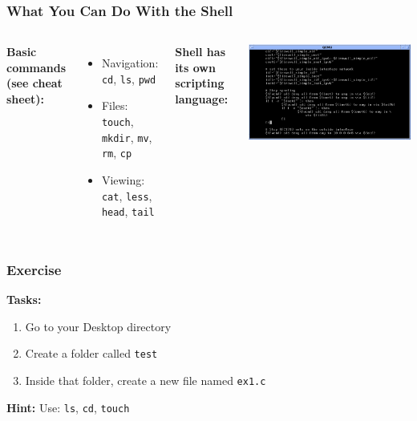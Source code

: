 \documentclass[aspectratio=169]{beamer}
\begin{document}
\begin{frame}
  \frametitle{What You Can Do With the Shell}

  \begin{columns}[T] 
    \begin{minipage}[t]{\linewidth}
      \textbf{Basic commands (see cheat sheet):}
      \begin{itemize}
        \item Navigation: \texttt{cd}, \texttt{ls}, \texttt{pwd}
        \item Files: \texttt{touch}, \texttt{mkdir}, \texttt{mv}, \texttt{rm}, \texttt{cp}
        \item Viewing: \texttt{cat}, \texttt{less}, \texttt{head}, \texttt{tail}
      \end{itemize}
    \end{minipage}

    \begin{minipage}[t]{\linewidth}
      \textbf{Shell has its own scripting language:}

      \vspace{0.5em}
      \includegraphics[width=\linewidth]{img/shell-scripting1.png}
    \end{minipage}
  \end{columns}
\end{frame}


\begin{frame}
  \frametitle{Exercise}
  \textbf{Tasks:}
  \begin{enumerate}
    \item Go to your Desktop directory
    \item Create a folder called \texttt{test}
    \item Inside that folder, create a new file named \texttt{ex1.c}
  \end{enumerate}

  \vspace{1em}
  \textbf{Hint:}
  Use: \texttt{ls}, \texttt{cd}, \texttt{touch}

\end{frame}
\end{document}

